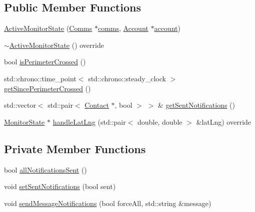 \subsection*{Public Member Functions}
\begin{DoxyCompactItemize}
\item 
\hyperlink{class_active_monitor_state_af1a0341307d63c900ccdc0a99fbe59e0}{Active\+Monitor\+State} (\hyperlink{class_comms}{Comms} $\ast$\hyperlink{class_monitor_state_a41914e9963c67ef2d17774f04bad3518}{comms}, \hyperlink{class_account}{Account} $\ast$\hyperlink{class_monitor_state_a41128d4942ec0d5b107c63d1d95af811}{account})
\item 
\hyperlink{class_active_monitor_state_accb86642ec52bae9aacd2aa4e9ff4410}{$\sim$\+Active\+Monitor\+State} () override
\item 
bool \hyperlink{class_active_monitor_state_a4566e7e96a777df86ab78ec326b551d0}{is\+Perimeter\+Crossed} ()
\item 
std\+::chrono\+::time\+\_\+point$<$ std\+::chrono\+::steady\+\_\+clock $>$ \hyperlink{class_active_monitor_state_ab94dede8d2e407aaddb0df056f5a329c}{get\+Since\+Perimeter\+Crossed} ()
\item 
std\+::vector$<$ std\+::pair$<$ \hyperlink{class_contact}{Contact} $\ast$, bool $>$ $>$ \& \hyperlink{class_active_monitor_state_ac1d5b33105abe5bd68ed5ee0396bc3be}{get\+Sent\+Notifications} ()
\item 
\hyperlink{class_monitor_state}{Monitor\+State} $\ast$ \hyperlink{class_active_monitor_state_a0eb7622ad3aa4d372d90589838cb50a9}{handle\+Lat\+Lng} (std\+::pair$<$ double, double $>$ \&lat\+Lng) override
\end{DoxyCompactItemize}
\subsection*{Private Member Functions}
\begin{DoxyCompactItemize}
\item 
bool \hyperlink{class_active_monitor_state_add557ab0dd0774482c08c982b82395e7}{all\+Notifications\+Sent} ()
\item 
void \hyperlink{class_active_monitor_state_adedd023d280922991a5dd980017549ec}{set\+Sent\+Notifications} (bool sent)
\item 
void \hyperlink{class_active_monitor_state_aae5b3a425c74e7017446be277d69c06d}{send\+Message\+Notifications} (bool force\+All, std\+::string \&message)
\end{DoxyCompactItemize}
